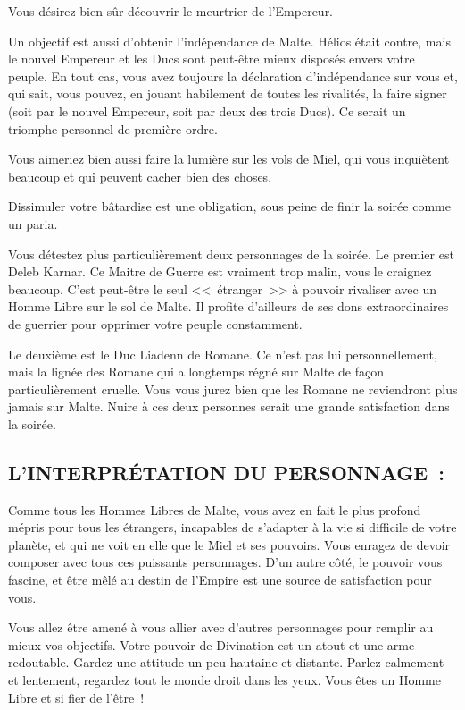\documentclass[14pt,twocolumn]{extarticle}
\begin{document}
Vous désirez bien sûr découvrir le meurtrier de l'Empereur.

Un objectif est aussi d'obtenir l'indépendance de Malte. Hélios était contre,
mais le nouvel Empereur et les Ducs sont peut-être mieux disposés envers votre
peuple. En tout cas, vous avez toujours la déclaration d'indépendance sur vous
et, qui sait, vous pouvez, en jouant habilement de toutes les rivalités, la
faire signer (soit par le nouvel Empereur, soit par deux des trois Ducs). Ce
serait un triomphe personnel de première ordre.

Vous aimeriez bien aussi faire la lumière sur les vols de Miel, qui vous
inquiètent beaucoup et qui peuvent cacher bien des choses.

Dissimuler votre bâtardise est une obligation, sous peine de finir la soirée
comme un paria.

Vous détestez plus particulièrement deux personnages de la soirée. Le premier
est Deleb Karnar. Ce Maitre de Guerre est vraiment trop malin, vous le craignez
beaucoup. C'est peut-être le seul <<~étranger~>> à pouvoir rivaliser avec un
Homme Libre sur le sol de Malte. Il profite d'ailleurs de ses dons
extraordinaires de guerrier pour opprimer votre peuple constamment.

Le deuxième est le Duc Liadenn de Romane. Ce n'est pas lui personnellement,
mais la lignée des Romane qui a longtemps régné sur Malte de façon
particulièrement cruelle. Vous vous jurez bien que les Romane ne reviendront
plus jamais sur Malte. Nuire à ces deux personnes serait une grande
satisfaction dans la soirée.

\subsection{L'INTERPRÉTATION DU PERSONNAGE~:}

Comme tous les Hommes Libres de Malte, vous avez en fait le plus profond mépris
pour tous les étrangers, incapables de s'adapter à la vie si difficile de votre
planète, et qui ne voit en elle que le Miel et ses pouvoirs. Vous enragez de
devoir composer avec tous ces puissants personnages. D'un autre côté, le
pouvoir vous fascine, et être mêlé au destin de l'Empire est une source de
satisfaction pour vous.

Vous allez être amené à vous allier avec d'autres personnages pour remplir au
mieux vos objectifs. Votre pouvoir de Divination est un atout et une arme
redoutable. Gardez une attitude un peu hautaine et distante. Parlez calmement
et lentement, regardez tout le monde droit dans les yeux. Vous êtes un Homme
Libre et si fier de l'être~!
\end{document}
